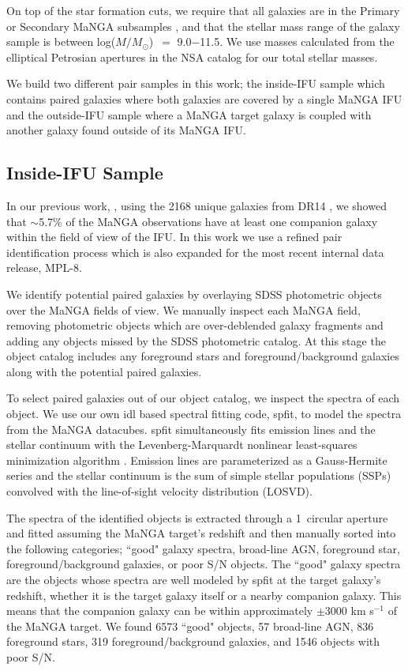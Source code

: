 \documentclass[iop,revtex4,twocolumn,apj,numberedappendix,appendixfloats]{emulateapj}
\newcommand{\logm}{log($M/M_{\odot}$)}
\begin{document}
On top of the star formation cuts, we require that all galaxies are in the Primary or Secondary MaNGA subsamples \citep{Wake:2017}, and that the stellar mass range of the galaxy sample is between \logm\ $=$ 9.0$-$11.5. We use masses calculated from the elliptical Petrosian apertures in the NSA catalog for our total stellar masses. 

We build two different pair samples in this work; the inside-IFU sample which contains paired galaxies where both galaxies are covered by a single MaNGA IFU and the outside-IFU sample where a MaNGA target galaxy is coupled with another galaxy found outside of its MaNGA IFU. 

\subsection{Inside-IFU Sample}\label{sec:inside}

In our previous work, \citet{Fu:2018}, using the 2168 unique galaxies from DR14 \citep{Abolfathi:2018}, we showed that $\sim$5.7\% of the MaNGA observations have at least one companion galaxy within the field of view of the IFU. In this work we use a refined pair identification process which is also expanded for the most recent internal data release, MPL-8.

We identify potential paired galaxies by overlaying SDSS photometric objects over the MaNGA fields of view. We manually inspect each MaNGA field, removing photometric objects which are over-deblended galaxy fragments and adding any objects missed by the SDSS photometric catalog. At this stage the object catalog includes any foreground stars and foreground/background galaxies along with the potential paired galaxies. 

To select paired galaxies out of our object catalog, we inspect the spectra of each object. We use our own {\sc idl} based spectral fitting code, {\sc spfit}, to model the spectra from the MaNGA datacubes. {\sc spfit} simultaneously fits emission lines and the stellar continuum with the Levenberg-Marquardt nonlinear least-squares minimization algorithm \citep{Fu:2018}. Emission lines are parameterized as a Gauss-Hermite series and the stellar continuum is the sum of simple stellar populations (SSPs) convolved with the line-of-sight velocity distribution (LOSVD).

The spectra of the identified objects is extracted through a 1\arcsec\ circular aperture and fitted assuming the MaNGA target's redshift and then manually sorted into the following categories; ``good" galaxy spectra, broad-line AGN, foreground star, foreground/background galaxies, or poor S/N objects. The ``good" galaxy spectra are the objects whose spectra are well modeled by {\sc spfit} at the target galaxy's redshift, whether it is the target galaxy itself or a nearby companion galaxy. This means that the companion galaxy can be within approximately $\pm$3000 km s$^{-1}$ of the MaNGA target. We found 6573 ``good" objects, 57 broad-line AGN, 836 foreground stars, 319 foreground/background galaxies, and 1546 objects with poor S/N. 
\end{document}
